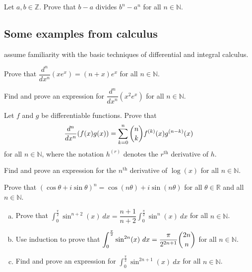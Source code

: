\begin{chapex}
Let $a,b \in \mathbb{Z}$. Prove that $b-a$ divides $b^n-a^n$ for all $n \in \mathbb{N}$.
\end{chapex}

\subsection*{Some examples from calculus}

 assume familiarity with the basic techniques of differential and integral calculus.

\begin{chapex}
\label{cqCalculusBegin}
Prove that $\dfrac{d^n}{dx^n}(xe^x) = (n+x)e^x$ for all $n \in \mathbb{N}$.
\end{chapex}

\begin{chapex}
Find and prove an expression for $\dfrac{d^n}{dx^n}(x^2e^x)$ for all $n \in \mathbb{N}$.
\end{chapex}

\begin{chapex}
Let $f$ and $g$ be differentiable functions. Prove that
\[ \dfrac{d^n}{dx^n}(f(x)g(x)) = \sum_{k=0}^n \dbinom{n}{k} f^{(k)}(x) g^{(n-k)}(x) \]
for all $n \in \mathbb{N}$, where the notation $h^{(r)}$ denotes the $r^{\text{th}}$ derivative of $h$.
\end{chapex}

\begin{chapex}
Find and prove an expression for the $n^{\text{th}}$ derivative of $\log(x)$ for all $n \in \mathbb{N}$.
\end{chapex}

\begin{chapex}
Prove that $(\cos \theta + i \sin \theta)^n = \cos (n\theta) + i \sin (n\theta)$ for all $\theta \in \mathbb{R}$ and all $n \in \mathbb{N}$.
\end{chapex}

\begin{chapex}
\label{cqCalculusEnd}
\begin{enumerate}[(a)]
\item Prove that $\displaystyle \int_0^{\frac{\pi}{2}} \sin^{n+2}(x)~dx = \dfrac{n+1}{n+2} \int_0^{\frac{\pi}{2}} \sin^n(x)~dx$ for all $n \in \mathbb{N}$.
\item Use induction to prove that $\displaystyle \int_0^{\frac{\pi}{2}} \sin^{2n}(x)~dx = \dfrac{\pi}{2^{2n+1}} \dbinom{2n}{n}$ for all $n \in \mathbb{N}$.
\item Find and prove an expression for $\displaystyle \int_0^{\frac{\pi}{2}} \sin^{2n+1}(x)~dx$ for all $n \in \mathbb{N}$.
\end{enumerate}
\end{chapex}
